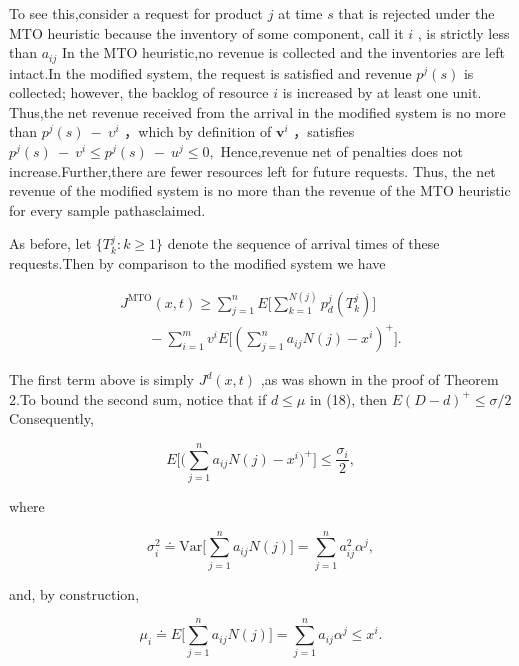 To see this,consider a request for product \(j\) at time \(s\) that is
rejected under the MTO heuristic because the inventory of some
component, call it \(i\) , is strictly less than \(a _ { i j }\) In the
MTO heuristic,no revenue is collected and the inventories are left
intact.In the modified system, the request is satisfied and revenue
\(p ^ { j } ( s )\) is collected; however, the backlog of resource \(i\)
is increased by at least one unit. Thus,the net revenue received from
the arrival in the modified system is no more than
\(p ^ { j } ( s ) \ - \ \upsilon ^ { i }\) ，which by definition of
\(\boldsymbol { v } ^ { i }\) ，satisfies
\(p ^ { j } ( s ) ~ - ~ v ^ { i } \leqslant p ^ { j } ( s ) ~ - ~ u ^ { j } \leqslant 0 ,\)
Hence,revenue net of penalties does not increase.Further,there are fewer
resources left for future requests. Thus, the net revenue of the
modified system is no more than the revenue of the MTO heuristic for
every sample pathasclaimed.

As before, let \(\{ T _ { k } ^ { j } \colon k \geqslant 1 \}\) denote
the sequence of arrival times of these requests.Then by comparison to
the modified system we have

\[
\begin{array} { c } { { \displaystyle { J ^ { \mathrm { M T O } } ( x , t ) \geqslant \sum _ { j = 1 } ^ { n } E \Bigg [ \sum _ { k = 1 } ^ { N ( j ) } p _ { d } ^ { j } ( T _ { k } ^ { j } ) \Bigg ] } } } \\ { { \displaystyle { \qquad - \sum _ { i = 1 } ^ { m } v ^ { i } E \Bigg [ \left( \sum _ { j = 1 } ^ { n } a _ { i j } N ( j ) - x ^ { i } \right) ^ { + } \Bigg ] . } } } \end{array}
\]

The first term above is simply \(J ^ { d } ( x , t )\) ,as was shown in
the proof of Theorem 2.To bound the second sum, notice that if
\(d \leqslant \mu\) in (18), then
\(E ( D - d ) ^ { + } \leqslant \sigma / 2\) Consequently,

\[
E \Bigg [ \Bigg ( \sum _ { j = 1 } ^ { n } a _ { i j } N ( j ) - x ^ { i } \Bigg ) ^ { + } \Bigg ] \leqslant \frac { \sigma _ { i } } { 2 } ,
\]

where

\[
\sigma _ { i } ^ { 2 } \doteq \mathrm { V a r } \biggl [ \sum _ { j = 1 } ^ { n } a _ { i j } N ( j ) \biggr ] = \sum _ { j = 1 } ^ { n } a _ { i j } ^ { 2 } \alpha ^ { j } ,
\]

and, by construction,

\[
\mu _ { i } \doteq E { \biggl [ } \sum _ { j = 1 } ^ { n } a _ { i j } N ( j ) { \biggr ] } = \sum _ { j = 1 } ^ { n } a _ { i j } \alpha ^ { j } \leqslant x ^ { i } .
\]

